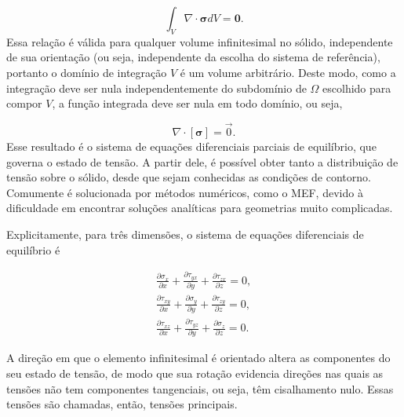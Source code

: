 \begin{equation}
    \int_V \nabla \cdot \bm{\sigma} dV = \bm{0}.
\end{equation}
Essa relação é válida para qualquer volume infinitesimal no sólido, independente de sua orientação (ou seja, independente da escolha do sistema de referência), portanto o domínio de integração $V$ é um volume arbitrário. Deste modo, como a integração deve ser nula independentemente do subdomínio de $\Omega$ escolhido para compor $V$, a função integrada deve ser nula em todo domínio, ou seja,

\begin{equation}
    \nabla \cdot [\bm{\sigma}] = \vec{0}.
\end{equation}
Esse resultado é o sistema de equações diferenciais parciais de equilíbrio, que governa o estado de tensão. A partir dele, é possível obter tanto a distribuição de tensão sobre o sólido, desde que sejam conhecidas as condições de contorno. Comumente é solucionada por métodos numéricos, como o MEF, devido à dificuldade em encontrar soluções analíticas para geometrias muito complicadas. 

Explicitamente, para três dimensões, o sistema de equações diferenciais de equilíbrio é

\begin{gather}
       \displaystyle \frac{\partial \sigma_x}{\partial x} + \frac{\partial \tau_{yx}}{\partial y} + \frac{\partial \tau_{zx}}{\partial z} = 0, \\
       \displaystyle \frac{\partial \tau_{xy}}{\partial x} + \frac{\partial \sigma_y}{\partial y} + \frac{\partial \tau_{zy}}{\partial z} = 0, \\
       \displaystyle \frac{\partial \tau_{xz}}{\partial x} + \frac{\partial \tau_{yz}}{\partial y} + \frac{\partial \sigma_z}{\partial z} = 0.
       \label{eq:equilibrio_governo}
\end{gather}


A direção em que o elemento infinitesimal é orientado altera as componentes do seu estado de tensão, de modo que sua rotação evidencia direções nas quais as tensões não tem componentes tangenciais, ou seja, têm cisalhamento nulo. Essas tensões são chamadas, então, tensões principais.

